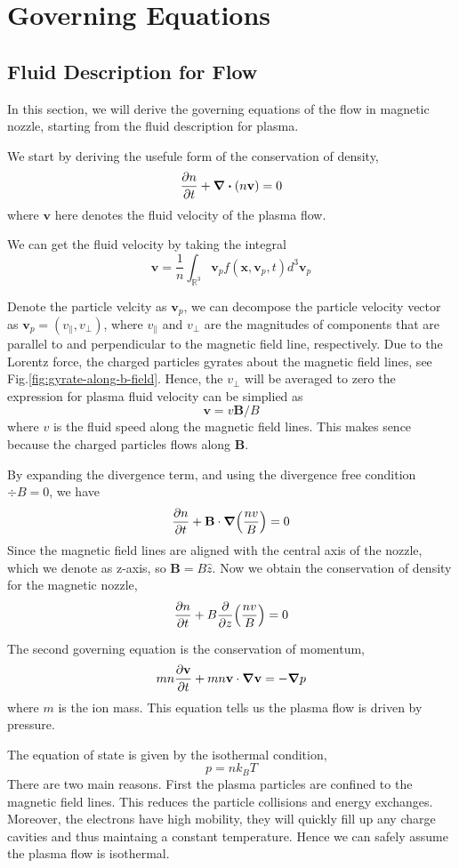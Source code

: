 \chapter{Governing Equations} \label{chap:governing-equations}
\section{Fluid Description for Flow}
In this section, we will derive the governing equations of the flow in magnetic nozzle, starting from the fluid description for plasma.

We start by deriving the usefule form of the conservation of density,
\[ \pdv{n}{t} + \div(n\mathbf{v}) = 0 \]
where $\mathbf{v}$ here denotes the fluid velocity of the plasma flow.

We can get the fluid velocity by taking the integral
\[ \mathbf{v} = \frac{1}{n}\int_{\mathbb{R}^3} \mathbf{v}_p f(\mathbf{x}, \mathbf{v}_p, t) d^3\mathbf{v}_p \] 

Denote the particle velcity as $\mathbf{v}_p$, we can decompose the particle velocity vector as $\mathbf{v}_p = (v_\parallel,v_\perp)$, where $v_\parallel$ and $v_\perp$ are the magnitudes of components that are parallel to and perpendicular to the magnetic field line, respectively. Due to the Lorentz force, the charged particles gyrates about the magnetic field lines, see Fig.\ref{fig:gyrate-along-b-field}. Hence, the $v_\perp$ will be averaged to zero the expression for plasma fluid velocity can be simplied as 
\[\mathbf{v} = v\mathbf{B}/B\]
where $v$ is the fluid speed along the magnetic field lines. This makes sence because the charged particles flows along $\mathbf{B}$.

By expanding the divergence term, and using the divergence free condition $\div B=0$, we have 
\[ \pdv{n}{t} + \mathbf{B}\cdot \grad(\frac{nv}{B}) = 0 \]
Since the magnetic field lines are aligned with the central axis of the nozzle, which we denote as z-axis, so $\mathbf{B} = B\hat{z}$. Now we obtain the conservation of density for the magnetic nozzle, 
\begin{equation}
	\pdv{n}{t} + B\pdv{z}(\frac{nv}{B}) = 0 
\end{equation}

The second governing equation is the conservation of momentum, 
\[ mn\pdv{\mathbf{v}}{t} + mn\mathbf{v}\cdot\grad\mathbf{v} = -\grad p \]
where $m$ is the ion mass. This equation tells us the plasma flow is driven by pressure.

The equation of state is given by the isothermal condition,
\begin{equation} \label{eq:eos}
	p = nk_BT
\end{equation}
There are two main reasons. First the plasma particles are confined to the magnetic field lines. This reduces the particle collisions and energy exchanges. Moreover, the electrons have high mobility, they will quickly fill up any charge cavities and thus maintaing a constant temperature. Hence we can safely assume the plasma flow is isothermal.

